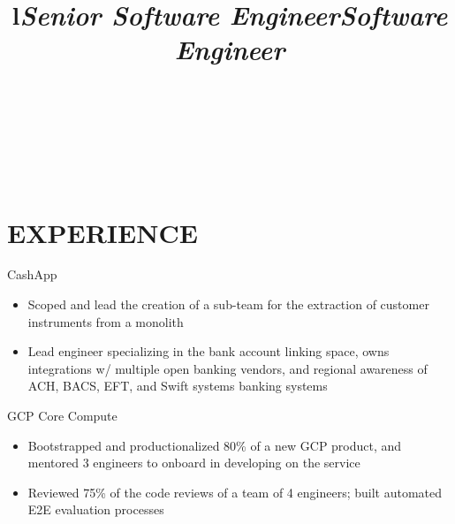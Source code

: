 \documentclass[margin,11pt]{res}
\begin{document}

\address{mark.x.qi@gmail.com $\bullet$ 404-952-0273 $\bullet$ 901 NW 61$^{st}$ St., Seattle, WA 98107}


\begin{resume}

\begin{format}
\\
\title{l}\\
\body\\
\end{format}

\section{EXPERIENCE}

\title{\sl{Senior Software Engineer}}
\begin{position}
CashApp\\
\begin{itemize}
\item Scoped and lead the creation of a sub-team for the extraction of customer instruments from a monolith
\item Lead engineer specializing in the bank account linking space, owns integrations w/ multiple open banking vendors, and regional awareness of ACH, BACS, EFT, and Swift systems banking systems
\end{itemize}
\end{position}

\title{\sl{Software Engineer}}
\begin{position}
GCP Core Compute\\
\begin{itemize}
\item Bootstrapped and productionalized 80\% of a new GCP product, and mentored 3 engineers to onboard in developing on the service
\item Reviewed 75\% of the code reviews of a team of 4 engineers; built automated E2E evaluation processes 
\end{itemize}
\end{position}


\end{resume}
\end{document}
